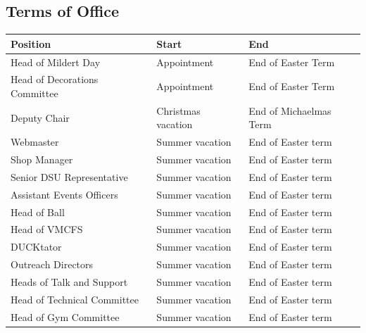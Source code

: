 \documentclass[12pt]{article}
\begin{document}
    \subsection{Terms of Office}
    \begin{longtable}{|l|l|l|}
        \hline
        \textbf{Position} & \textbf{Start} & \textbf{End}\\
        \hline\hline
        \endhead
        \hline
        \endfoot

        Head of Mildert Day & Appointment & End of Easter Term\\
        Head of Decorations Committee & Appointment & End of Easter Term\\
        Deputy Chair & Christmas vacation & End of Michaelmas Term\\
        Webmaster & Summer vacation & End of Easter term\\
        Shop Manager & Summer vacation & End of Easter term\\
        Senior DSU Representative & Summer vacation & End of Easter term\\
        Assistant Events Officers & Summer vacation & End of Easter term\\
        Head of Ball & Summer vacation & End of Easter term\\
        Head of VMCFS & Summer vacation & End of Easter term\\
        DUCKtator & Summer vacation & End of Easter term\\
        Outreach Directors & Summer vacation & End of Easter term\\
        Heads of Talk and Support & Summer vacation & End of Easter term\\
        Head of Technical Committee & Summer vacation & End of Easter term\\
        Head of Gym Committee & Summer vacation & End of Easter term\\
    \end{longtable}
\end{document}
